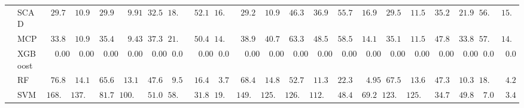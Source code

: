 \begin{tabular}{p{0.2cm}p{1cm}|p{0.6cm}p{0.6cm}|p{0.6cm}p{0.6cm}p{0.6cm}p{0.6cm}p{0.6cm}p{0.6cm}|p{0.6cm}p{0.6cm}p{0.6cm}p{0.6cm}p{0.6cm}p{0.6cm}|p{0.6cm}p{0.6cm}p{0.6cm}p{0.6cm}p{0.6cm}p{0.6cm}}
 & SCAD  & $\phantom{0}29.74$ & $\phantom{0}10.96$ & $\phantom{0}29.97$ & $\phantom{00}9.91$ & $\phantom{0}32.51$ & $18.84$ & $\phantom{0}52.19$ & $16.28$ & $\phantom{0}29.26$ & $\phantom{0}10.97$ & $\phantom{0}46.37$ & $\phantom{0}36.99$ & $\phantom{0}55.71$ & $\phantom{0}16.92$ & $\phantom{0}29.57$ & $\phantom{0}11.59$ & $\phantom{0}35.21$ & $\phantom{0}21.92$ & $56.46$ & $15.15$ \\
 & MCP  & $\phantom{0}33.80$ & $\phantom{0}10.93$ & $\phantom{0}35.41$ & $\phantom{00}9.43$ & $\phantom{0}37.32$ & $21.00$ & $\phantom{0}50.46$ & $14.80$ & $\phantom{0}38.95$ & $\phantom{0}40.73$ & $\phantom{0}63.33$ & $\phantom{0}48.56$ & $\phantom{0}58.55$ & $\phantom{0}14.14$ & $\phantom{0}35.17$ & $\phantom{0}11.50$ & $\phantom{0}47.88$ & $\phantom{0}33.86$ & $57.17$ & $14.71$ \\
 & XGBoost  & $\phantom{00}0.00$ & $\phantom{00}0.00$ & $\phantom{00}0.00$ & $\phantom{00}0.00$ & $\phantom{00}0.00$ & $\phantom{0}0.00$ & $\phantom{00}0.00$ & $\phantom{0}0.00$ & $\phantom{00}0.00$ & $\phantom{00}0.00$ & $\phantom{00}0.00$ & $\phantom{00}0.00$ & $\phantom{00}0.00$ & $\phantom{00}0.00$ & $\phantom{00}0.00$ & $\phantom{00}0.00$ & $\phantom{00}0.00$ & $\phantom{00}0.00$ & $\phantom{0}0.00$ & $\phantom{0}0.00$ \\
 & RF  & $\phantom{0}76.87$ & $\phantom{0}14.15$ & $\phantom{0}65.66$ & $\phantom{0}13.13$ & $\phantom{0}47.66$ & $\phantom{0}9.50$ & $\phantom{0}16.42$ & $\phantom{0}3.76$ & $\phantom{0}68.43$ & $\phantom{0}14.86$ & $\phantom{0}52.70$ & $\phantom{0}11.31$ & $\phantom{0}22.30$ & $\phantom{00}4.95$ & $\phantom{0}67.58$ & $\phantom{0}13.67$ & $\phantom{0}47.39$ & $\phantom{0}10.35$ & $18.75$ & $\phantom{0}4.29$ \\
 & SVM  & $168.49$ & $137.29$ & $\phantom{0}81.76$ & $100.97$ & $\phantom{0}51.02$ & $58.93$ & $\phantom{0}31.87$ & $19.60$ & $149.20$ & $125.77$ & $126.61$ & $112.50$ & $\phantom{0}48.41$ & $\phantom{0}69.21$ & $123.76$ & $125.31$ & $\phantom{0}34.76$ & $\phantom{0}49.83$ & $\phantom{0}7.00$ & $\phantom{0}3.41$ \\
\hline 
\end{tabular}


